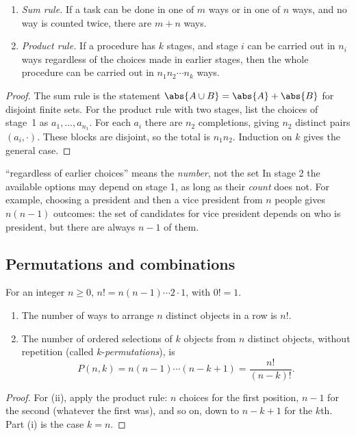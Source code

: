 \begin{proposition}\label{prop:rules}
\begin{enumerate}[label=(\roman*)]
\item \emph{Sum rule.} If a task can be done in one of $m$ ways or in one of
$n$ ways, and no way is counted twice, there are $m+n$ ways.
\item \emph{Product rule.} If a procedure has $k$ stages, and stage $i$ can be
carried out in $n_i$ ways regardless of the choices made in earlier stages,
then the whole procedure can be carried out in $n_1n_2\cdots n_k$ ways.
\end{enumerate}
\end{proposition}
\begin{proof}
The sum rule is the statement $\abs{A\cup B}=\abs{A}+\abs{B}$ for disjoint
finite sets. For the product rule with two stages, list the choices of stage~1
as $a_1,\dots,a_{n_1}$. For each $a_i$ there are $n_2$ completions, giving
$n_2$ distinct pairs $(a_i,\cdot)$. These blocks are disjoint, so the total is
$n_1n_2$. Induction on $k$ gives the general case.
\end{proof}

\begin{nuance}{``regardless of earlier choices'' means the \emph{number}, not the set}
In stage 2 the available options may depend on stage 1, as long as their
\emph{count} does not. For example, choosing a president and then a vice
president from $n$ people gives $n(n-1)$ outcomes: the set of candidates for
vice president depends on who is president, but there are always $n-1$ of
them.
\end{nuance}

\subsection{Permutations and combinations}

\begin{definition}[Factorial]
For an integer $n\ge 0$, $n!=n(n-1)\cdots 2\cdot 1$, with $0!=1$.
\end{definition}

\begin{proposition}[Arrangements]\label{prop:perm}
\begin{enumerate}[label=(\roman*)]
\item The number of ways to arrange $n$ distinct objects in a row is $n!$.
\item The number of ordered selections of $k$ objects from $n$ distinct
objects, without repetition (called $k$-\emph{permutations}), is
\[
P(n,k)=n(n-1)\cdots(n-k+1)=\frac{n!}{(n-k)!}.
\]
\end{enumerate}
\end{proposition}
\begin{proof}
For (ii), apply the product rule: $n$ choices for the first position, $n-1$ for
the second (whatever the first was), and so on, down to $n-k+1$ for the $k$th.
Part (i) is the case $k=n$.
\end{proof}

